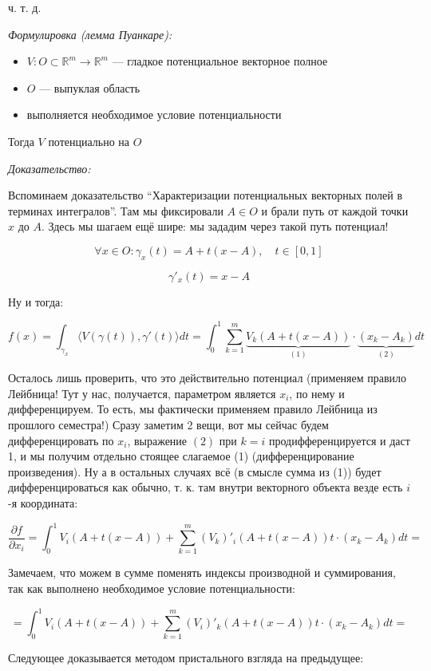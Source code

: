 \documentclass{article}
\def\sk#1#2{\langle #1, #2 \rangle}
\begin{document}
ч. т. д. 

\textit{Формулировка (лемма Пуанкаре):}

\begin{itemize}
    \item $V: O \subset \mathbb{R}^m \rightarrow \mathbb{R}^m$ --- гладкое потенциальное векторное полное
    \item $O$ --- выпуклая область
    \item выполняется необходимое условие потенциальности
\end{itemize}

Тогда $V$ потенциально на $O$

\textit{Доказательство: }

Вспоминаем доказательство ``Характеризации потенциальных векторных полей в терминах интегралов''. Там мы фиксировали $A \in O$ и брали путь от каждой точки $x$ до $A$. Здесь мы шагаем ещё шире: мы зададим через такой путь потенциал!

\[\forall x \in O : \gamma_x(t) = A + t(x - A), \quad t \in [0, 1]\]

\[\gamma'_x(t) = x - A\]

Ну и тогда:

\[f(x) = \int_{\gamma_x} \sk{V(\gamma(t))}{\gamma'(t)}dt = \int_0^1 \sum_{k = 1}^m \underbrace{V_k(A + t(x - A))}_{(1)}\cdot\underbrace{(x_k - A_k)}_{(2)} dt\]

Осталось лишь проверить, что это действительно потенциал (применяем правило Лейбница! Тут у нас, получается, параметром является $x_i$, по нему и дифференцируем. То есть, мы фактически применяем правило Лейбница из прошлого семестра!) Сразу заметим 2 вещи, вот мы сейчас будем дифференцировать по $x_i$, выражение $(2)$ при $k = i$ продифференцируется и даст 1, и мы получим отдельно стоящее слагаемое (1) (дифференцирование произведения). Ну а в остальных случаях всё (в смысле сумма из (1)) будет дифференцироваться как обычно, т. к. там внутри векторного объекта везде есть $i$-я координата:

\[\frac{\partial f}{\partial x_i} = \int_0^1 V_i(A + t(x - A)) + \sum_{k = 1}^m (V_k)'_i(A + t(x - A)) t\cdot (x_k - A_k )dt = \]

Замечаем, что можем в сумме поменять индексы производной и суммирования, так как выполнено необходимое условие потенциальности:

\[ = \int_0^1 V_i(A + t(x - A)) + \sum_{k = 1}^m (V_i)'_k(A + t(x - A)) t\cdot (x_k - A_k )dt =\]

Следующее доказывается методом пристального взгляда на предыдущее:
\end{document}
